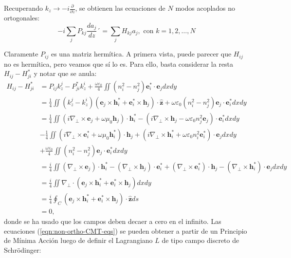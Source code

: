 Recuperando $k_z \to -i\frac{\partial}{\partial z}$, se obtienen las ecuaciones de $N$ modos acoplados no ortogonales:
\begin{equation}
	-i \sum_{j} P_{kj} \frac{d a_j}{dz} ´= \sum_{j} H_{kj} a_j, \text{ con }k=1,2,\dots,N \label{eqn:non-ortho-CMT-eqs}
\end{equation}
	
Claramente $P_{ij}$ es una matriz hermítica. A primera vista, puede parecer que $H_{ij}$ no es hermítica, pero veamos que sí lo es. Para ello, basta considerar la resta $H_{ij} - H_{ji}^*$ y notar que se anula:
\begin{align*}
 H_{ij} - H_{ji}^* &= P_{ij} k_z^j - P_{ji}^* k_z^i  + \frac{\omega \varepsilon_0}{4} \iint(n_i^2-n_j^2) \textbf{e}_i^* \cdot \textbf{e}_j dxdy
\\
&= \frac{1}{4} \iint (k_z^j-k_z^i)( \textbf{e}_j \times  \textbf{h}_i^* + \textbf{e}_i^* \times  \textbf{h}_j  )\cdot\hat{\textbf{z}} + \omega\varepsilon_0 (n_i^2-n_j^2) \textbf{e}_j \cdot \textbf{e}_i^* dxdy
\\
&= \frac{1}{4} \iint \left( i\nabla_\perp \times \textbf{e}_j +\omega\mu_0 \textbf{h}_j \right) \cdot \textbf{h}_i^* - \left( i\nabla_\perp \times \textbf{h}_j  - \omega\varepsilon_0n_j^2 \textbf{e}_j \right) \cdot \textbf{e}_i^*dxdy
\\
&- \frac{1}{4} \iint \left( i\nabla_\perp \times \textbf{e}_i^* +\omega\mu_0 \textbf{h}_i^*\right) \cdot \textbf{h}_j + \left(i\nabla_\perp \times \textbf{h}_i^*  + \omega\varepsilon_0n_i^2 \textbf{e}_i^* \right) \cdot \textbf{e}_jdxdy
\\
&+\frac{\omega\varepsilon_0}{4}\iint  \left(n_i^2-n_j^2\right) \textbf{e}_j \cdot \textbf{e}_i^* dxdy
\\
&= \frac{i}{4} \iint \left(\nabla_\perp\times\textbf{e}_j\right) \cdot \textbf{h}_i^*  -\left(\nabla_\perp\times\textbf{h}_j\right) \cdot \textbf{e}_i^* + \left(\nabla_\perp\times\textbf{e}_i^*\right) \cdot \textbf{h}_j - \left(\nabla_\perp\times\textbf{h}_i^*\right) \cdot \textbf{e}_j dxdy
\\
&= \frac{i}{4} \iint \nabla_\perp\cdot\left(\textbf{e}_j \times \textbf{h}_i^* +\textbf{e}_i^* \times \textbf{h}_j\right) dxdy
\\
&=
\frac{i}{4} \oint_C \left(\textbf{e}_j \times \textbf{h}_i^* +\textbf{e}_i^* \times \textbf{h}_j\right) \cdot \hat{\textbf{z}} ds
\\
&=
0,
	\end{align*}
donde se ha usado que los campos deben decaer a cero en el infinito. Las ecuaciones (\ref{eqn:non-ortho-CMT-eqs}) se pueden obtener a partir de un Principio de Mínima Acción luego de definir el Lagrangiano $L$ de tipo campo discreto de Schrödinger:
